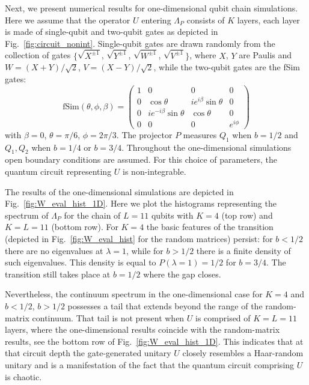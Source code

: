 \documentclass[%
 reprint,
 superscriptaddress,
 amsmath,amssymb,
prx,
]{revtex4-2}\href{\href{}{}}{}
\begin{document}
Next, we present numerical results for one-dimensional qubit chain simulations.
Here we assume that the operator $U$ entering $\Lambda_P$ consists of $K$ layers, each layer is made of single-qubit and two-qubit gates as depicted in Fig.~\ref{fig:circuit_nonint}.
Single-qubit gates are drawn randomly from the collection of gates $\{\sqrt{X^{\pm1}}$, $\sqrt{Y^{\pm1}}$, $\sqrt{W^{\pm1}}$, $\sqrt{V^{\pm1}}\}$, where $X$, $Y$ are Paulis and $W=(X+Y)/\sqrt{2}$, $V=(X-Y)/\sqrt{2}$, while the two-qubit gates are the fSim gates:
\begin{equation}
	\text{fSim}(\theta,\phi,\beta) =
	\begin{pmatrix}
		1 & 0 & 0 & 0 \\
		0 & \cos\theta & ie^{i\beta}\sin\theta & 0 \\
        0 & ie^{-i\beta}\sin\theta & \cos\theta & 0 \\
        0 & 0 & 0 & e^{i\phi}
	\end{pmatrix}
 \label{eq:fSim}
\end{equation}
with $\beta=0$, $\theta=\pi/6$, $\phi=2\pi/3$.
The projector $P$ measures $Q_1$ when $b=1/2$ and $Q_1, Q_2$ when $b=1/4$ or $b=3/4$.
Throughout the one-dimensional simulations open boundary conditions are assumed.
For this choice of parameters, the quantum circuit representing $U$ is non-integrable.

The results of the one-dimensional simulations are depicted in Fig.~\ref{fig:W_eval_hist_1D}.
Here we plot the histograms representing the spectrum of $\Lambda_P$ for the chain of $L=11$ qubits with $K=4$ (top row) and $K=L=11$ (bottom row).
For $K=4$ the basic features of the transition (depicted in Fig.~\ref{fig:W_eval_hist} for the random matrices) persist: for $b<1/2$ there are no eigenvalues at $\lambda=1$, while for $b>1/2$ there is a finite density of such eigenvalues.
This density is equal to $P(\lambda=1)=1/2$ for $b=3/4$.
The transition still takes place at $b=1/2$ where the gap closes.

Nevertheless, the continuum spectrum in the one-dimensional case for $K=4$ and $b<1/2$, $b>1/2$ possesses a tail that extends beyond the range of the random-matrix continuum.
That tail is not present when $U$ is comprised of $K=L=11$ layers, where the one-dimensional results coincide with the random-matrix results, see the bottom row of Fig.~\ref{fig:W_eval_hist_1D}.
This indicates that at that circuit depth the gate-generated unitary $U$ closely resembles a Haar-random unitary and is a manifestation of the fact that the quantum circuit comprising $U$ is chaotic.
\end{document}
